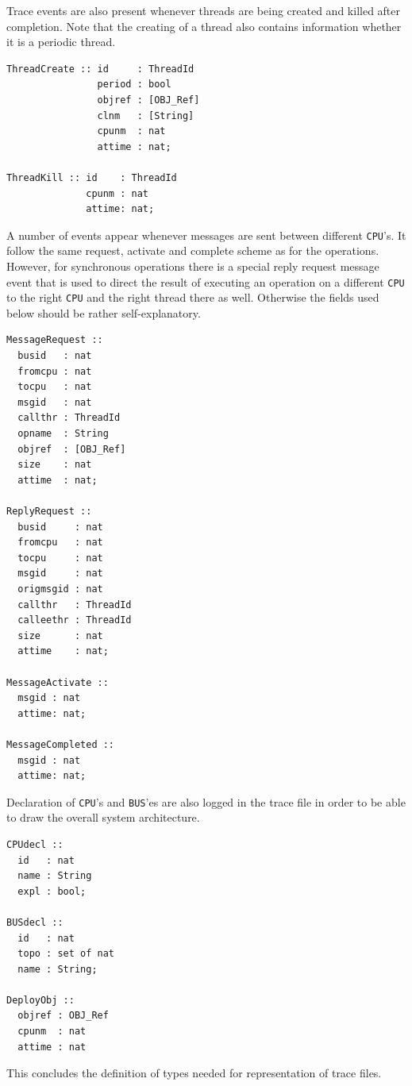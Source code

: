 \documentclass{overturerepchap}
\begin{document}
Trace events are also present whenever threads are being created and killed
after completion. Note that the creating of a thread also contains information
whether it is a periodic thread.

\begin{lstlisting}
ThreadCreate :: id     : ThreadId
                period : bool
                objref : [OBJ_Ref]
                clnm   : [String] 
                cpunm  : nat
                attime : nat;

ThreadKill :: id    : ThreadId
              cpunm : nat
              attime: nat;
\end{lstlisting}

A number of events appear whenever messages are sent between different 
\texttt{CPU}'s.
It follow the same request, activate and complete scheme as for the
operations. However, for synchronous operations there is a special reply
request message event that is used to direct the result of executing 
an operation on a different \texttt{CPU} to the right \texttt{CPU} and the
right thread there as well. Otherwise the fields used below should be rather
self-explanatory.

\begin{lstlisting}
MessageRequest ::
  busid   : nat
  fromcpu : nat
  tocpu   : nat
  msgid   : nat
  callthr : ThreadId
  opname  : String
  objref  : [OBJ_Ref]
  size    : nat
  attime  : nat;

ReplyRequest ::
  busid     : nat
  fromcpu   : nat
  tocpu     : nat
  msgid     : nat
  origmsgid : nat
  callthr   : ThreadId
  calleethr : ThreadId
  size      : nat
  attime    : nat;

MessageActivate ::
  msgid : nat
  attime: nat;

MessageCompleted ::
  msgid : nat
  attime: nat;
\end{lstlisting}

Declaration of \texttt{CPU}'s and \texttt{BUS}'es are also logged 
in the trace file in order to be able to draw the overall system architecture.

\begin{lstlisting}
CPUdecl ::
  id   : nat
  name : String
  expl : bool;
  
BUSdecl ::
  id   : nat
  topo : set of nat
  name : String;

DeployObj ::
  objref : OBJ_Ref
  cpunm  : nat
  attime : nat
\end{lstlisting}
 
This concludes the definition of types needed for representation of
trace files.
\end{document}
